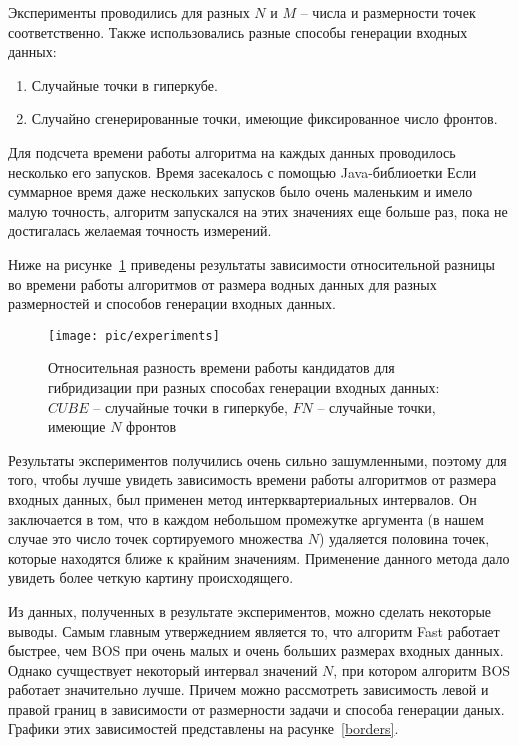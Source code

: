 Эксперименты проводились для разных $N$ и $M$ -- числа и размерности точек соответственно. Также использовались
разные способы генерации входных данных:

\begin{enumerate}
 \item Случайные точки в гиперкубе.
 \item Случайно сгенерированные точки, имеющие фиксированное число фронтов.
\end{enumerate}

Для подсчета времени работы алгоритма на каждых данных проводилось несколько его запусков. Время засекалось с помощью
Java-библиоетки %
Если суммарное время даже нескольких запусков было очень маленьким и имело малую точность, алгоритм запускался на
этих значениях еще больше раз, пока не достигалась желаемая точность измерений.

Ниже на рисунке~\ref{experiment} приведены результаты зависимости относительной разницы во времени работы алгоритмов
от размера водных данных для разных размерностей и способов генерации входных данных.


\begin{figure}
\begin{center}
\texttt{[image: pic/experiments]}
\caption{Относительная разность времени работы кандидатов для гибридизации при разных способах генерации входных
данных: $CUBE$ -- случайные точки в гиперкубе, $FN$ -- случайные точки, имеющие $N$ фронтов}
\label{experiment} %
\end{center}
\end{figure}

Результаты экспериментов получились очень сильно зашумленными, поэтому для того, чтобы лучше увидеть зависимость
времени работы алгоритмов от размера входных данных, был применен метод интерквартериальных интервалов. Он
заключается в том, что в каждом небольшом промежутке аргумента (в нашем случае это число точек сортируемого
множества $N$) удаляется половина точек, которые находятся ближе к крайним значениям. Применение данного метода
дало увидеть более четкую картину происходящего.

Из данных, полученных в результате экспериментов, можно сделать некоторые выводы. Самым главным утвержеднием
является то, что алгоритм Fast работает быстрее, чем BOS при очень малых и очень больших размерах входных данных.
Однако сучществует некоторый интервал значений $N$, при котором алгоритм BOS работает значительно лучше. Причем
можно рассмотреть зависимость левой и правой границ в зависимости от размерности задачи и способа генерации даных.
Графики этих зависимостей представлены на расунке~\ref{borders}.


